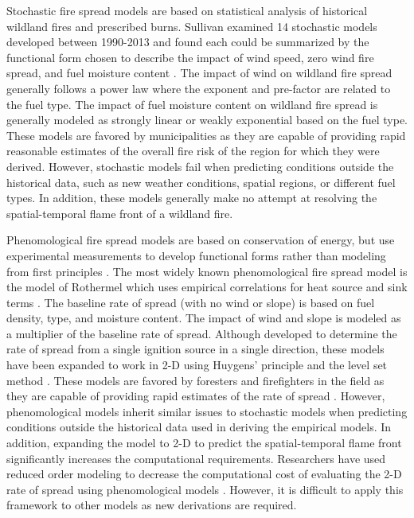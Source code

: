 \documentclass[smallcondensed]{svjour3}     %
\begin{document}
Stochastic fire spread models are based on statistical analysis of
historical wildland fires and prescribed burns. Sullivan examined 14
stochastic models developed between 1990-2013 and found each could be
summarized by the functional form chosen to describe the impact of wind speed,
zero wind fire spread, and fuel moisture content \cite{sullivan2007b}.
The impact of wind on wildland fire spread generally follows a power law
where the exponent and pre-factor are related to the fuel type. The
impact of fuel moisture content on wildland fire spread is generally
modeled as strongly linear or weakly exponential based on the fuel type.
These models are favored by municipalities as they are capable of
providing rapid reasonable estimates of the overall fire risk of the
region for which they were derived. However, stochastic models fail when
predicting conditions outside the historical data, such as new weather
conditions, spatial regions, or different fuel types. In addition, these
models generally make no attempt at resolving the spatial-temporal flame
front of a wildland fire.

Phenomological fire spread models are based on conservation of
energy, but use experimental measurements to develop functional forms
rather than modeling from first principles \cite{weber1991modelling,sullivan2007b}.
The most widely
known phenomological fire spread model is the model of Rothermel
\cite{rothermel1972mathematical,scott2005standard} which uses
empirical correlations for heat source and sink terms \cite{weber1991modelling}.
The baseline rate of spread (with no wind or slope) is based on fuel density,
type, and moisture content. The impact of wind and slope is modeled as a multiplier
of the baseline rate of spread. Although developed to determine the rate of spread
from a single ignition source in a single direction, these models have been expanded
to work in 2-D using Huygens' principle \cite{finney1999mechanistic,finney1998farsite}
and the level set method \cite{rehm2009fire,lautenberger2013wildland}.
These models are favored by foresters and
firefighters in the field as they are capable of providing rapid estimates
of the rate of spread \cite{simeoni2015wildland}. However, phenomological models
inherit similar issues to stochastic models when predicting conditions
outside the historical data used in deriving the empirical models. In addition,
expanding the model to 2-D to predict the spatial-temporal flame front significantly
increases the computational requirements.
Researchers have used
reduced order modeling to decrease the computational cost of evaluating the
2-D rate of spread using phenomological models \cite{lattimer2016computationally}.
However, it is difficult to apply this framework to other models as new derivations
are required.
\end{document}
